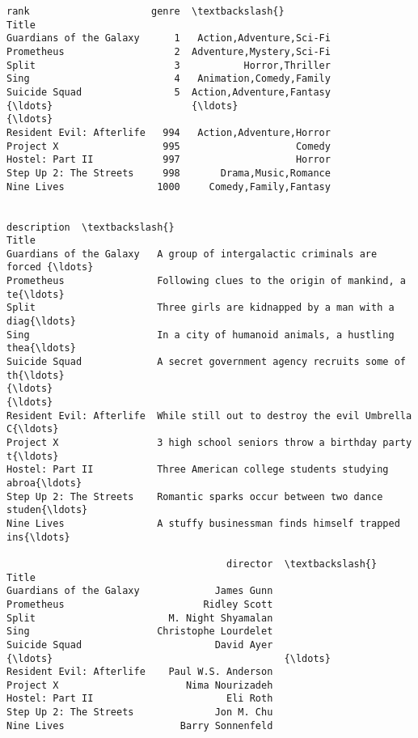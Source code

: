 \documentclass[11pt]{article}
\makeatletter
\newcommand{\boxspacing}{\kern\kvtcb@left@rule\kern\kvtcb@boxsep}
\newcommand{\prompt}[4]{
        {\ttfamily\llap{{\color{#2}[#3]:\hspace{3pt}#4}}\vspace{-\baselineskip}}
    }
\makeatother
\begin{document}
            \begin{tcolorbox}[breakable, size=fbox, boxrule=.5pt, pad at break*=1mm, opacityfill=0]
\prompt{Out}{outcolor}{26}{\boxspacing}
\begin{Verbatim}[commandchars=\\\{\}]
                          rank                     genre  \textbackslash{}
Title
Guardians of the Galaxy      1   Action,Adventure,Sci-Fi
Prometheus                   2  Adventure,Mystery,Sci-Fi
Split                        3           Horror,Thriller
Sing                         4   Animation,Comedy,Family
Suicide Squad                5  Action,Adventure,Fantasy
{\ldots}                        {\ldots}                       {\ldots}
Resident Evil: Afterlife   994   Action,Adventure,Horror
Project X                  995                    Comedy
Hostel: Part II            997                    Horror
Step Up 2: The Streets     998       Drama,Music,Romance
Nine Lives                1000     Comedy,Family,Fantasy

                                                                description  \textbackslash{}
Title
Guardians of the Galaxy   A group of intergalactic criminals are forced {\ldots}
Prometheus                Following clues to the origin of mankind, a te{\ldots}
Split                     Three girls are kidnapped by a man with a diag{\ldots}
Sing                      In a city of humanoid animals, a hustling thea{\ldots}
Suicide Squad             A secret government agency recruits some of th{\ldots}
{\ldots}                                                                     {\ldots}
Resident Evil: Afterlife  While still out to destroy the evil Umbrella C{\ldots}
Project X                 3 high school seniors throw a birthday party t{\ldots}
Hostel: Part II           Three American college students studying abroa{\ldots}
Step Up 2: The Streets    Romantic sparks occur between two dance studen{\ldots}
Nine Lives                A stuffy businessman finds himself trapped ins{\ldots}

                                      director  \textbackslash{}
Title
Guardians of the Galaxy             James Gunn
Prometheus                        Ridley Scott
Split                       M. Night Shyamalan
Sing                      Christophe Lourdelet
Suicide Squad                       David Ayer
{\ldots}                                        {\ldots}
Resident Evil: Afterlife    Paul W.S. Anderson
Project X                      Nima Nourizadeh
Hostel: Part II                       Eli Roth
Step Up 2: The Streets              Jon M. Chu
Nine Lives                    Barry Sonnenfeld


\end{Verbatim}
\end{tcolorbox}
\end{document}
